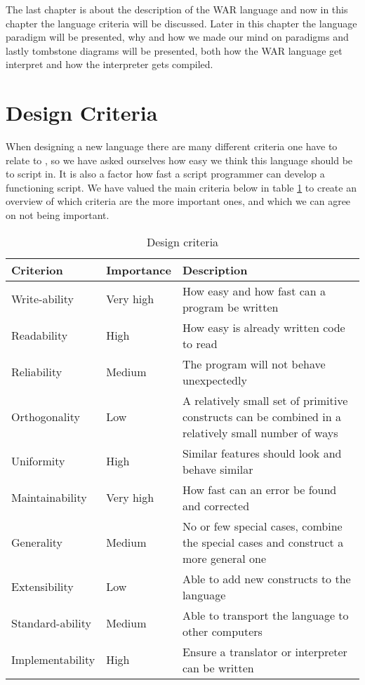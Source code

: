 The last chapter is about the description of the WAR language and now in this chapter the language criteria will be discussed. Later in this chapter the language paradigm will be presented, why and how we made our mind on paradigms and lastly tombstone diagrams will be presented, both how the WAR language get interpret and how the interpreter gets compiled.
\section{Design Criteria}\label{chap:DesCrit}
When designing a new language there are many different criteria one have to relate to \cite{SPOBOG2}, so we have asked ourselves how easy we think this language should be to script in. It is also a factor how fast a script programmer can develop a functioning script. We have valued the main criteria below in table \ref{tab:criteria_tabular} to create an overview of which criteria are the more important ones, and which we can agree on not being important.   

\begin{table}[H]
	\begin{tabular}{| 	l	|	 l	| p{7cm}	|}
	\hline
	Criterion			&	Importance	&		Description	\\	
	\hline
	Write-ability 		& 	Very high	&		How easy and how fast can a program be written\\
	Readability			& 	High		&		How easy is already written code to read\\
	Reliability			& 	Medium		&		The program will not behave unexpectedly\\
	Orthogonality		& 	Low			&		A relatively small set of primitive constructs can be combined in a relatively small number of ways\\
	Uniformity			& 	High		&		Similar features should look and behave similar\\
	Maintainability		& 	Very high	&		How fast can an error be found and corrected\\
	Generality			& 	Medium		&		No or few special cases, combine the special cases and construct a more general one\\
	Extensibility		& 	Low			&		Able to add new constructs to the language\\
	Standard-ability		& 	Medium		&		Able to transport the language to other computers\\
	Implementability	& 	High			&		Ensure a translator or interpreter can be written\\
	\hline
	\end{tabular}
	\caption{Design criteria \cite{criteria}}
	\label{tab:criteria_tabular}
\end{table}


